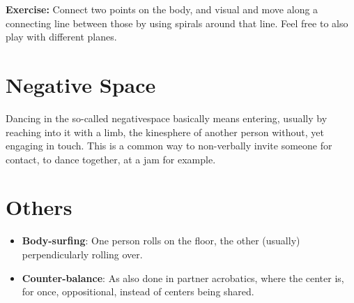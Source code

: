 \textbf{Exercise:} Connect two points on the body, and visual and move along a connecting line between those by using spirals around that line.
Feel free to also play with different planes.

\section{Negative Space}\label{sec:negative-space}

Dancing in the so-called \gls{negativespace} basically means entering, usually by reaching into it with a limb, the \gls{kinesphere} of another person without, yet engaging in touch.
This is a common way to non-verbally invite someone for contact, to dance together, at a jam for example.

\section{Others}\label{sec:others}

\begin{itemize}
    \item \textbf{Body-surfing}: One person rolls on the floor, the other (usually) perpendicularly rolling over.
    \item \textbf{Counter-balance}: As also done in partner acrobatics, where the center is, for once, oppositional, instead of centers being shared.
\end{itemize}